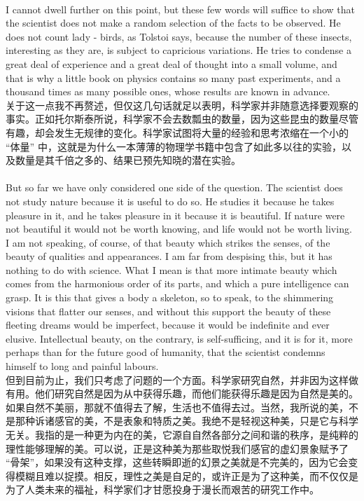 \documentclass{article}
\begin{document}
\\
I cannot dwell further on this point, but these few words will suffice to show that the scientist does not make a random selection of the facts to be observed. He does not count lady - birds, as Tolstoi says, because the number of these insects, interesting as they are, is subject to capricious variations. He tries to condense a great deal of experience and a great deal of thought into a small volume, and that is why a little book on physics contains so many past experiments, and a thousand times as many possible ones, whose results are known in advance.\\
关于这一点我不再赘述，但仅这几句话就足以表明，科学家并非随意选择要观察的事实。正如托尔斯泰所说，科学家不会去数瓢虫的数量，因为这些昆虫的数量尽管有趣，却会发生无规律的变化。科学家试图将大量的经验和思考浓缩在一个小的 “体量” 中，这就是为什么一本薄薄的物理学书籍中包含了如此多以往的实验，以及数量是其千倍之多的、结果已预先知晓的潜在实验。 \\

\\
But so far we have only considered one side of the question. The scientist does not study nature because it is useful to do so. He studies it because he takes pleasure in it, and he takes pleasure in it because it is beautiful. If nature were not beautiful it would not be worth knowing, and life would not be worth living. I am not speaking, of course, of that beauty which strikes the senses, of the beauty of qualities and appearances. I am far from despising this, but it has nothing to do with science. What I mean is that more intimate beauty which comes from the harmonious order of its parts, and which a pure intelligence can grasp. It is this that gives a body a skeleton, so to speak, to the shimmering visions that flatter our senses, and without this support the beauty of these fleeting dreams would be imperfect, because it would be indefinite and ever elusive. Intellectual beauty, on the contrary, is self-sufficing, and it is for it, more perhaps than for the future good of humanity, that the scientist condemns himself to long and painful labours.\\
但到目前为止，我们只考虑了问题的一个方面。科学家研究自然，并非因为这样做有用。他们研究自然是因为从中获得乐趣，而他们能获得乐趣是因为自然是美的。如果自然不美丽，那就不值得去了解，生活也不值得去过。当然，我所说的美，不是那种诉诸感官的美，不是表象和特质之美。我绝不是轻视这种美，只是它与科学无关。我指的是一种更为内在的美，它源自自然各部分之间和谐的秩序，是纯粹的理性能够理解的美。可以说，正是这种美为那些取悦我们感官的虚幻景象赋予了 “骨架”，如果没有这种支撑，这些转瞬即逝的幻景之美就是不完美的，因为它会变得模糊且难以捉摸。相反，理性之美是自足的，或许正是为了这种美，而不仅仅是为了人类未来的福祉，科学家们才甘愿投身于漫长而艰苦的研究工作中。 \\
\end{document}
